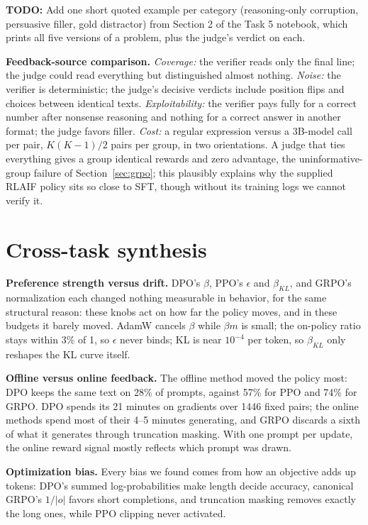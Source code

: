 \documentclass{article}
\newcommand{\todo}[1]{\colorbox{yellow!40}{\parbox{0.97\linewidth}{\small\textbf{TODO:} #1}}}
\begin{document}
\todo{Add one short quoted example per category (reasoning-only corruption, persuasive filler, gold distractor) from Section 2 of the Task 5 notebook, which prints all five versions of a problem, plus the judge's verdict on each.}

\textbf{Feedback-source comparison.} \emph{Coverage:} the verifier reads only the final line; the judge could read everything but distinguished almost nothing. \emph{Noise:} the verifier is deterministic; the judge's decisive verdicts include position flips and choices between identical texts. \emph{Exploitability:} the verifier pays fully for a correct number after nonsense reasoning and nothing for a correct answer in another format; the judge favors filler. \emph{Cost:} a regular expression versus a 3B-model call per pair, $K(K{-}1)/2$ pairs per group, in two orientations. A judge that ties everything gives a group identical rewards and zero advantage, the uninformative-group failure of Section~\ref{sec:grpo}; this plausibly explains why the supplied RLAIF policy sits so close to SFT, though without its training logs we cannot verify it.

\section{Cross-task synthesis}
\textbf{Preference strength versus drift.} DPO's $\beta$, PPO's $\epsilon$ and $\beta_{KL}$, and GRPO's normalization each changed nothing measurable in behavior, for the same structural reason: these knobs act on how far the policy moves, and in these budgets it barely moved. AdamW cancels $\beta$ while $\beta m$ is small; the on-policy ratio stays within 3\% of 1, so $\epsilon$ never binds; KL is near $10^{-4}$ per token, so $\beta_{KL}$ only reshapes the KL curve itself.

\textbf{Offline versus online feedback.} The offline method moved the policy most: DPO keeps the same text on 28\% of prompts, against 57\% for PPO and 74\% for GRPO. DPO spends its 21 minutes on gradients over 1446 fixed pairs; the online methods spend most of their 4--5 minutes generating, and GRPO discards a sixth of what it generates through truncation masking. With one prompt per update, the online reward signal mostly reflects which prompt was drawn.

\textbf{Optimization bias.} Every bias we found comes from how an objective adds up tokens: DPO's summed log-probabilities make length decide accuracy, canonical GRPO's $1/|o|$ favors short completions, and truncation masking removes exactly the long ones, while PPO clipping never activated.
\end{document}
